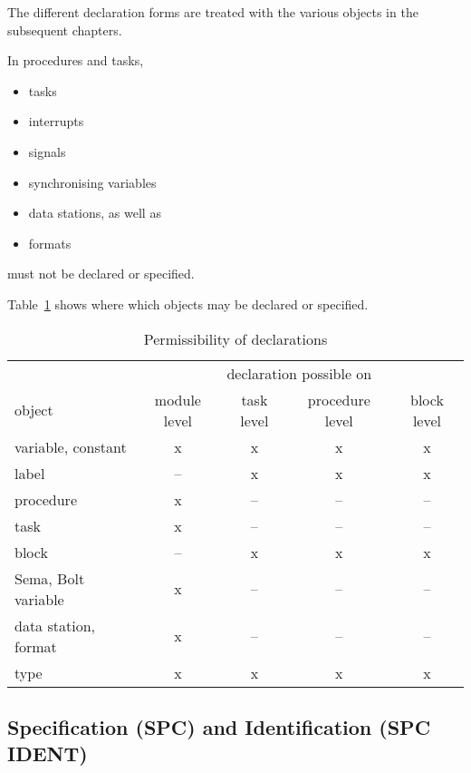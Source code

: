 The different declaration forms are treated with the various objects in
the subsequent chapters.

In procedures and tasks,
\begin{itemize}
\item tasks
\item interrupts
\item signals
\item synchronising variables
\item data stations, as well as
\item formats
\end{itemize}
must not be declared or specified.

Table~\ref{objekte} shows where which objects may be declared or
specified.

\begin{table}
\caption{Permissibility of declarations\label{objekte}}
\vspace{5mm}

\begin{tabular}{|l|c|c|c|c|}
\hline
                       & \multicolumn{4}{|c|}{declaration possible on} \\
object                 & module level & task level & procedure level & block level \\ \hline
variable, constant     & x            & x    & x         & x  \\
label                  & --           & x    & x         & x  \\
procedure              & x            & --    & --         & -- \\
task                   & x            & --   & --        & -- \\
block                  & --           & x    & x         & x  \\
Sema, Bolt variable    & x            & --   & --        & -- \\
data station, format   & x            & --   & --        & -- \\
type                   & x            & x    & x         & x \\
\hline
\end{tabular}
\end{table}

\subsection{Specification (SPC) and Identification (SPC IDENT)}  %

